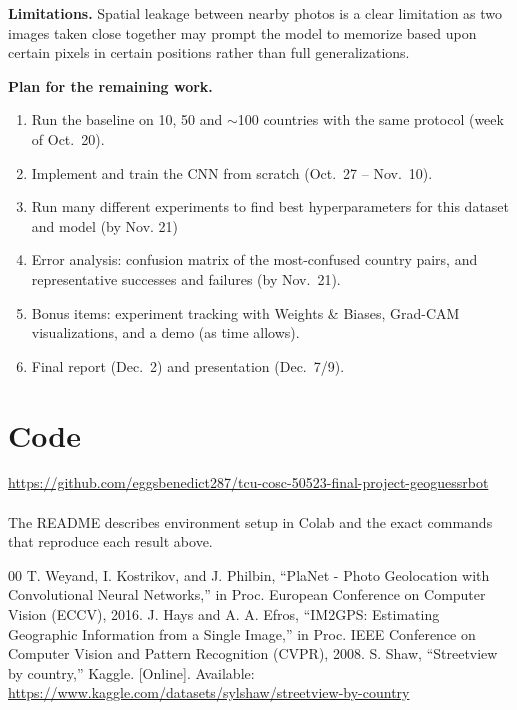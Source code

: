 \documentclass[conference]{IEEEtran}
\begin{document}
\textbf{Limitations.} Spatial leakage between nearby photos is a clear limitation as two images taken close together may prompt the model to memorize based upon certain pixels in certain positions rather than full generalizations.

\textbf{Plan for the remaining work.} 
\begin{enumerate}
  \item Run the baseline on 10, 50 and $\sim$100 countries with the same
  protocol (week of Oct.~20).
  \item Implement and train the CNN from scratch (Oct.~27 -- Nov.~10).
  \item Run many different experiments to find best hyperparameters for this dataset and model (by Nov. 21)
  \item Error analysis: confusion matrix of the most-confused country pairs,
  and representative successes and failures (by Nov.~21).
  \item Bonus items: experiment tracking with Weights \& Biases, Grad-CAM
  visualizations, and a demo (as time allows).
  \item Final report (Dec.~2) and presentation (Dec.~7/9).
\end{enumerate}

\section{Code}

\hyperref[https://github.com/eggsbenedict287/tcu-cosc-50523-final-project-geoguessrbot]{https://github.com/eggsbenedict287/tcu-cosc-50523-final-project-geoguessrbot}
\\\\
The README describes environment setup in Colab and the exact commands that
reproduce each result above.



\begin{thebibliography}{00}
 T. Weyand, I. Kostrikov, and J. Philbin, ``PlaNet - Photo Geolocation with Convolutional Neural Networks,'' in Proc. European Conference on Computer Vision (ECCV), 2016.
 J. Hays and A. A. Efros, ``IM2GPS: Estimating Geographic Information from a Single Image,'' in Proc. IEEE Conference on Computer Vision and Pattern Recognition (CVPR), 2008.
 S. Shaw, ``Streetview by country,'' Kaggle. [Online]. Available: \url{https://www.kaggle.com/datasets/sylshaw/streetview-by-country}
\end{thebibliography}
\end{document}
